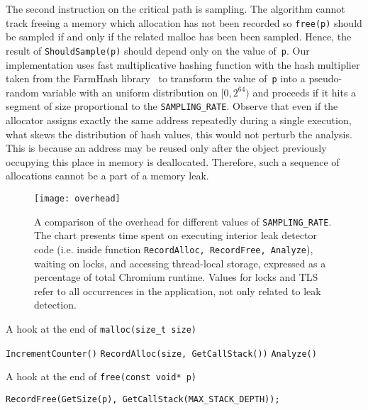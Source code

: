 \documentclass[preprint, numbers]{sigplanconf}
\newcommand{\comment}[1]{{\color{blue}{#1}}}
\begin{document}
The second instruction on the critical path is sampling.
The algorithm cannot track freeing a memory which allocation has not been recorded
so \texttt{free(p)} should be sampled if and only if the related malloc has been been sampled.
Hence, the result of \texttt{ShouldSample(p)} should depend only on the value of~\texttt{p}.
Our implementation uses fast multiplicative hashing function with the hash multiplier taken from the FarmHash library~\cite{farmhash}
to transform the value of~\texttt{p} into a pseudo-random variable with an uniform
distribution on $[0, 2^{64})$ and proceeds if it hits a segment of size proportional
to the \texttt{SAMPLING\_RATE}.
Observe that even if the allocator assigns exactly the same address repeatedly during a single execution,
what skews the distribution of hash values, this would not perturb the analysis.
This is because an address may be reused only after the object previously occupying
this place in memory is deallocated.
Therefore, such a sequence of allocations cannot be a part of a memory leak.

\begin{figure}
\centering
\texttt{[image: overhead]}
	\caption{A comparison of the overhead for different values of \texttt{SAMPLING\_RATE}.
	The chart presents time spent on executing interior leak detector code (i.e. inside
	function \texttt{RecordAlloc, RecordFree, Analyze}), waiting on locks, and accessing
	thread-local storage, expressed as a percentage of total Chromium runtime.
	Values for locks and TLS refer to all occurrences in the application, not only related to leak detection.
	\comment{We should elaborate on how this was measured.}
	}
\label{fig:overhead}
\end{figure}

\begin{algorithm}
	\caption{A hook at the end of \texttt{malloc(size\_t size)}}
\begin{algorithmic}[1]
	\State \texttt{IncrementCounter()}
		\Return
	\EndIf
	\State \texttt{RecordAlloc(size, GetCallStack())}
		\State \texttt{Analyze()}
	\EndIf
\EndFunction
\end{algorithmic}
\label{alg:alloc-hook}
\end{algorithm}

\begin{algorithm}
	\caption{A hook at the end of \texttt{free(const void* p)}}
\begin{algorithmic}[1]
		\Return
	\EndIf
	\State \texttt{RecordFree(GetSize(p), GetCallStack(MAX\_STACK\_DEPTH));}
\EndFunction
\end{algorithmic}
\label{alg:free-hook}
\end{algorithm}
\end{document}
